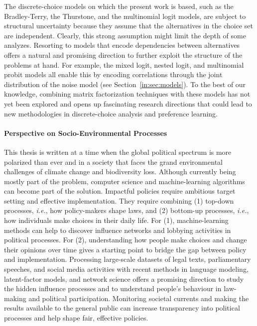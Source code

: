 The discrete-choice models on which the present work is based, such as the Bradley-Terry, the Thurstone, and the multinomial logit models, are subject to structural uncertainty because they assume that the alternatives in the choice set are independent.
Clearly, this strong assumption might limit the depth of some analyzes.
Resorting to models that encode dependencies between alternatives offers a natural and promising direction to further exploit the structure of the problems at hand.
For example, the mixed logit, nested logit, and multinomial probit models all enable this by encoding correlations through the joint distribution of the noise model (see Section~\ref{in:sec:models}).
To the best of our knowledge, combining matrix factorization techniques with these models has not yet been explored and opens up fascinating research directions that could lead to new methodologies in discrete-choice analysis and preference learning.

\paragraph{Perspective on Socio-Environmental Processes}

This thesis is written at a time when the global political spectrum is more polarized than ever and in a society that faces the grand environmental challenges of climate change and biodiversity loss.
Although currently being mostly part of the problem, computer science and machine-learning algorithms can become part of the solution.
Impactful policies require ambitious target setting and effective implementation.
They require combining (1) top-down processes, \textit{i.e.}, how policy-makers shape laws, and (2) bottom-up processes, \textit{i.e.}, how individuals make choices in their daily life.
For (1), machine-learning methods can help to discover influence networks and lobbying activities in political processes.
For (2), understanding how people make choices and change their opinions over time gives a starting point to bridge the gap between policy and implementation.
Processing large-scale datasets of legal texts, parliamentary speeches, and social media activities with recent methods in language modeling, latent-factor models, and network science offers a promising direction to study the hidden influence processes and to understand people's behaviour in law-making and political participation.
Monitoring societal currents and making the results available to the general public can increase transparency into political processes and help shape fair, effective policies.

